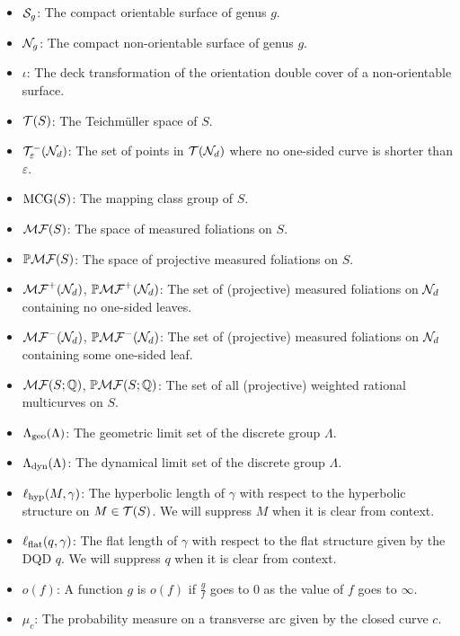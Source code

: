 \documentclass[12pt, reqno]{amsart}
\begin{document}
\begin{itemize}
\item[] $\mathcal{S}_g$: The compact orientable surface of genus $g$.
\item[] $\mathcal{N}_{g}$: The compact non-orientable surface of genus $g$.
\item[] $\iota$: The deck transformation of the orientation double cover of a non-orientable surface.
\item[] $\mathcal{T}(S)$: The Teichm\"uller space of $S$.
\item[] $\mathcal{T}_{\varepsilon}^{-}(\mathcal{N}_d)$: The set of points in $\mathcal{T}(\mathcal{N}_d)$ where no one-sided curve is shorter than
  $\varepsilon$.
\item[] $\mathrm{MCG}(S)$: The mapping class group of $S$.
\item[] $\mathcal{MF}(S)$: The space of measured foliations on $S$.
\item[] $\mathbb{P}\mathcal{MF}(S)$: The space of projective measured foliations on $S$.
\item[] $\mathcal{MF}^+(\mathcal{N}_d)$, $\mathbb{P}\mathcal{MF}^+(\mathcal{N}_d)$: The set of (projective) measured foliations on $\mathcal{N}_d$ containing
  no one-sided leaves.
\item[] $\mathcal{MF}^-(\mathcal{N}_d)$, $\mathbb{P}\mathcal{MF}^-(\mathcal{N}_d)$: The set of (projective) measured foliations on $\mathcal{N}_d$ containing
  some one-sided leaf.
\item[] $\mathcal{MF}(S; \mathbb{Q})$, $\mathbb{P}\mathcal{MF}(S; \mathbb{Q})$: The set of all (projective) weighted rational multicurves on $S$.
\item[] $\Lambda_{\mathrm{geo}}(\Lambda)$: The geometric limit set of the discrete group $\Lambda$.
\item[] $\Lambda_{\mathrm{dyn}}(\Lambda)$: The dynamical limit set of the discrete group $\Lambda$.
\item[] $\ell_{\mathrm{hyp}}(M, \gamma)$: The hyperbolic length of $\gamma$ with respect to the hyperbolic structure on $M \in \mathcal{T}(S)$. We will suppress $M$ when it is clear from context.
\item[] $\ell_{\mathrm{flat}}(q, \gamma)$: The flat length of $\gamma$ with respect to the flat structure given by the DQD $q$. We will suppress $q$ when it is clear from context.
\item[] $o(f)$: A function $g$ is $o(f)$ if $\frac{g}{f}$ goes to $0$ as the value of $f$ goes to $\infty$.
\item[] $\mu_{c}$: The probability measure on a transverse arc given by the closed curve $c$.
\end{itemize}
\end{document}
